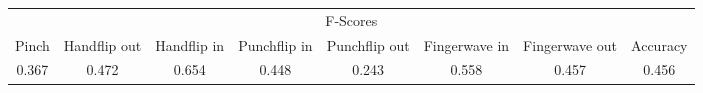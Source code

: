 \documentclass{standalone}
\begin{document}
 
 \begin{tabular}{|c|c|c|c|c|c|c ||c|}
\cline{1-8}\multicolumn{8}{|c|}{F-Scores} \\ 
\cline{1-8}Pinch & Handflip out & Handflip in & Punchflip in & Punchflip out & Fingerwave in & Fingerwave out & Accuracy\\ 
\cline{1-8}0.367 & 0.472 & 0.654 & 0.448 & 0.243 & 0.558 & 0.457 & 0.456\\ 
 \cline{1-8}\hline \end{tabular}
 
\end{document}
